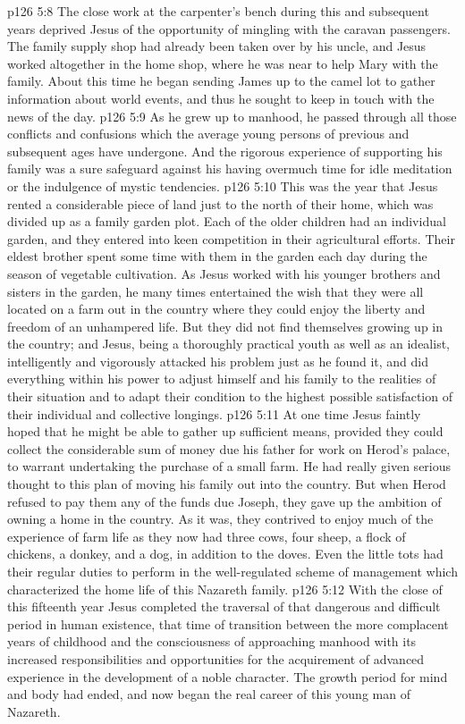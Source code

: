 \vs p126 5:8 The close work at the carpenter’s bench during this and subsequent years deprived Jesus of the opportunity of mingling with the caravan passengers. The family supply shop had already been taken over by his uncle, and Jesus worked altogether in the home shop, where he was near to help Mary with the family. About this time he began sending James up to the camel lot to gather information about world events, and thus he sought to keep in touch with the news of the day.
\vs p126 5:9 As he grew up to manhood, he passed through all those conflicts and confusions which the average young persons of previous and subsequent ages have undergone. And the rigorous experience of supporting his family was a sure safeguard against his having overmuch time for idle meditation or the indulgence of mystic tendencies.
\pc \vs p126 5:10 This was the year that Jesus rented a considerable piece of land just to the north of their home, which was divided up as a family garden plot. Each of the older children had an individual garden, and they entered into keen competition in their agricultural efforts. Their eldest brother spent some time with them in the garden each day during the season of vegetable cultivation. As Jesus worked with his younger brothers and sisters in the garden, he many times entertained the wish that they were all located on a farm out in the country where they could enjoy the liberty and freedom of an unhampered life. But they did not find themselves growing up in the country; and Jesus, being a thoroughly practical youth as well as an idealist, intelligently and vigorously attacked his problem just as he found it, and did everything within his power to adjust himself and his family to the realities of their situation and to adapt their condition to the highest possible satisfaction of their individual and collective longings.
\vs p126 5:11 At one time Jesus faintly hoped that he might be able to gather up sufficient means, provided they could collect the considerable sum of money due his father for work on Herod’s palace, to warrant undertaking the purchase of a small farm. He had really given serious thought to this plan of moving his family out into the country. But when Herod refused to pay them any of the funds due Joseph, they gave up the ambition of owning a home in the country. As it was, they contrived to enjoy much of the experience of farm life as they now had three cows, four sheep, a flock of chickens, a donkey, and a dog, in addition to the doves. Even the little tots had their regular duties to perform in the well\hyp{}regulated scheme of management which characterized the home life of this Nazareth family.
\pc \vs p126 5:12 With the close of this fifteenth year Jesus completed the traversal of that dangerous and difficult period in human existence, that time of transition between the more complacent years of childhood and the consciousness of approaching manhood with its increased responsibilities and opportunities for the acquirement of advanced experience in the development of a noble character. The growth period for mind and body had ended, and now began the real career of this young man of Nazareth.\plusone
